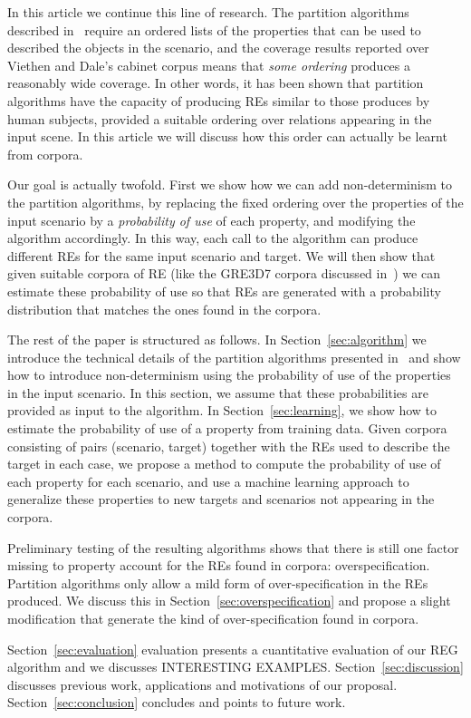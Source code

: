 In this article we continue this line of research.  The partition algorithms described in~\cite{arec:refe08,arec:usin11} require an 
ordered lists of the properties that can be used to described the objects in the scenario, and the coverage results reported over Viethen and 
Dale's cabinet corpus means that \emph{some ordering} produces a reasonably wide coverage.  In other words, it has been shown that partition algorithms have the capacity of producing REs similar to those produces by human subjects, provided a suitable ordering over relations appearing 
in the input scene. In this article we will discuss how this order can actually be learnt from corpora.  

Our goal is actually twofold. First we show how we can add non-determinism to the partition algorithms, by replacing the fixed ordering 
over the properties of the input scenario by a \emph{probability of use} of each property, and modifying the algorithm accordingly.  
In this way, each call to the algorithm can produce different REs for the same input scenario and target.  We will then show that given suitable corpora of RE (like the GRE3D7 corpora discussed in~\cite{viet:gene11}) we can estimate these probability of use so that REs are generated with a probability distribution that matches the ones found in the corpora.  

The rest of the paper is structured as follows. In Section~\ref{sec:algorithm} we introduce the technical details of the 
partition algorithms presented in~\cite{arec:refe08,arec:usin11} and show how to introduce non-determinism using 
the probability of use of the properties in the input scenario.  In this section, we assume that these probabilities are provided as 
input to the algorithm. In Section~\ref{sec:learning}, we show how to estimate the 
probability of use of a property from training data. Given corpora consisting of pairs (scenario, target) together with the REs used to 
describe the target in each case, we propose a method to compute the probability of use of each property for each scenario, and use a machine learning approach to generalize these properties to new targets and scenarios not appearing in the corpora. 

Preliminary testing of the resulting algorithms shows that there is still one factor missing to property account for the REs found in corpora: overspecification.  Partition algorithms only allow a mild form of over-specification in the REs produced.  We discuss this in Section~\ref{sec:overspecification} and propose a slight modification that generate the kind of over-specification found in corpora. 

Section~\ref{sec:evaluation} evaluation presents a cuantitative evaluation of our REG algorithm and we discusses INTERESTING EXAMPLES. Section~\ref{sec:discussion} discusses previous work, applications and motivations of our proposal. Section~\ref{sec:conclusion} concludes and points to future work.

